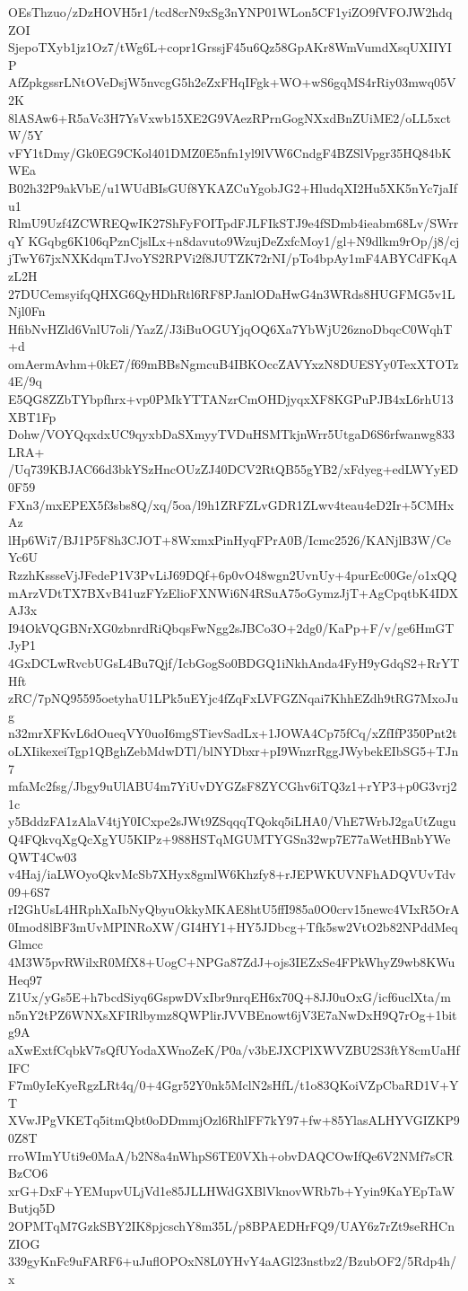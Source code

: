 OEsThzuo/zDzHOVH5r1/tcd8crN9xSg3nYNP01WLon5CF1yiZO9fVFOJW2hdqZOI
SjepoTXyb1jz1Oz7/tWg6L+copr1GrssjF45u6Qz58GpAKr8WmVumdXsqUXIIYIP
AfZpkgssrLNtOVeDsjW5nvcgG5h2eZxFHqIFgk+WO+wS6gqMS4rRiy03mwq05V2K
8lASAw6+R5aVc3H7YsVxwb15XE2G9VAezRPrnGogNXxdBnZUiME2/oLL5xctW/5Y
vFY1tDmy/Gk0EG9CKol401DMZ0E5nfn1yl9lVW6CndgF4BZSlVpgr35HQ84bKWEa
B02h32P9akVbE/u1WUdBIsGUf8YKAZCuYgobJG2+HludqXI2Hu5XK5nYc7jaIfu1
RlmU9Uzf4ZCWREQwIK27ShFyFOITpdFJLFIkSTJ9e4fSDmb4ieabm68Lv/SWrrqY
KGqbg6K106qPznCjslLx+n8davuto9WzujDeZxfcMoy1/gl+N9dlkm9rOp/j8/cj
jTwY67jxNXKdqmTJvoYS2RPVi2f8JUTZK72rNI/pTo4bpAy1mF4ABYCdFKqAzL2H
27DUCemsyifqQHXG6QyHDhRtl6RF8PJanlODaHwG4n3WRds8HUGFMG5v1LNjl0Fn
HfibNvHZld6VnlU7oli/YazZ/J3iBuOGUYjqOQ6Xa7YbWjU26znoDbqcC0WqhT+d
omAermAvhm+0kE7/f69mBBsNgmcuB4IBKOccZAVYxzN8DUESYy0TexXTOTz4E/9q
E5QG8ZZbTYbpfhrx+vp0PMkYTTANzrCmOHDjyqxXF8KGPuPJB4xL6rhU13XBT1Fp
Dohw/VOYQqxdxUC9qyxbDaSXmyyTVDuHSMTkjnWrr5UtgaD6S6rfwanwg833LRA+
/Uq739KBJAC66d3bkYSzHncOUzZJ40DCV2RtQB55gYB2/xFdyeg+edLWYyED0F59
FXn3/mxEPEX5f3sbs8Q/xq/5oa/l9h1ZRFZLvGDR1ZLwv4teau4eD2Ir+5CMHxAz
lHp6Wi7/BJ1P5F8h3CJOT+8WxmxPinHyqFPrA0B/Icmc2526/KANjlB3W/CeYc6U
RzzhKssseVjJFedeP1V3PvLiJ69DQf+6p0vO48wgn2UvnUy+4purEc00Ge/o1xQQ
mArzVDtTX7BXvB41uzFYzElioFXNWi6N4RSuA75oGymzJjT+AgCpqtbK4IDXAJ3x
I94OkVQGBNrXG0zbnrdRiQbqsFwNgg2sJBCo3O+2dg0/KaPp+F/v/ge6HmGTJyP1
4GxDCLwRvcbUGsL4Bu7Qjf/IcbGogSo0BDGQ1iNkhAnda4FyH9yGdqS2+RrYTHft
zRC/7pNQ95595oetyhaU1LPk5uEYjc4fZqFxLVFGZNqai7KhhEZdh9tRG7MxoJug
n32mrXFKvL6dOueqVY0uoI6mgSTievSadLx+1JOWA4Cp75fCq/xZfIfP350Pnt2t
oLXIikexeiTgp1QBghZebMdwDTl/blNYDbxr+pI9WnzrRggJWybekEIbSG5+TJn7
mfaMc2fsg/Jbgy9uUlABU4m7YiUvDYGZsF8ZYCGhv6iTQ3z1+rYP3+p0G3vrj21c
y5BddzFA1zAlaV4tjY0ICxpe2sJWt9ZSqqqTQokq5iLHA0/VhE7WrbJ2gaUtZugu
Q4FQkvqXgQcXgYU5KIPz+988HSTqMGUMTYGSn32wp7E77aWetHBnbYWeQWT4Cw03
v4Haj/iaLWOyoQkvMcSb7XHyx8gmlW6Khzfy8+rJEPWKUVNFhADQVUvTdv09+6S7
rI2GhUsL4HRphXaIbNyQbyuOkkyMKAE8htU5ffI985a0O0crv15newc4VIxR5OrA
0Imod8lBF3mUvMPINRoXW/GI4HY1+HY5JDbcg+Tfk5sw2VtO2b82NPddMeqGlmcc
4M3W5pvRWilxR0MfX8+UogC+NPGa87ZdJ+ojs3IEZxSe4FPkWhyZ9wb8KWuHeq97
Z1Ux/yGs5E+h7bcdSiyq6GspwDVxIbr9nrqEH6x70Q+8JJ0uOxG/icf6uclXta/m
n5nY2tPZ6WNXsXFIRlbymz8QWPlirJVVBEnowt6jV3E7aNwDxH9Q7rOg+1bitg9A
aXwExtfCqbkV7sQfUYodaXWnoZeK/P0a/v3bEJXCPlXWVZBU2S3ftY8cmUaHfIFC
F7m0yIeKyeRgzLRt4q/0+4Ggr52Y0nk5MclN2sHfL/t1o83QKoiVZpCbaRD1V+YT
XVwJPgVKETq5itmQbt0oDDmmjOzl6RhlFF7kY97+fw+85YlasALHYVGIZKP90Z8T
rroWImYUti9e0MaA/b2N8a4nWhpS6TE0VXh+obvDAQCOwIfQe6V2NMf7sCRBzCO6
xrG+DxF+YEMupvULjVd1e85JLLHWdGXBlVknovWRb7b+Yyin9KaYEpTaWButjq5D
2OPMTqM7GzkSBY2IK8pjcschY8m35L/p8BPAEDHrFQ9/UAY6z7rZt9seRHCnZIOG
339gyKnFc9uFARF6+uJuflOPOxN8L0YHvY4aAGl23nstbz2/BzubOF2/5Rdp4h/x
